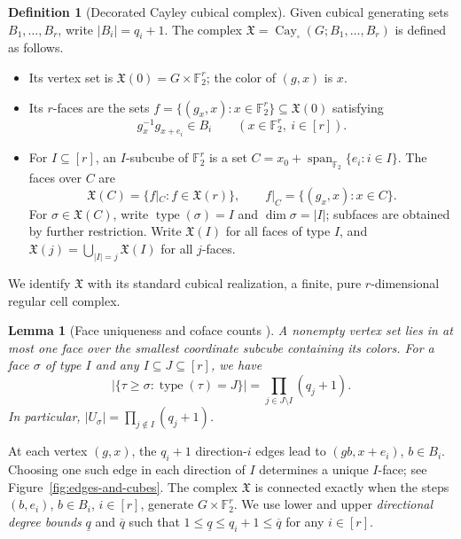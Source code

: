\documentclass[11pt,letterpaper]{article}
\renewcommand{\le}{\leqslant}
\renewcommand{\ge}{\geqslant}
\newtheorem{lemma}[theorem]{Lemma}
\theoremstyle{definition}
\newtheorem{definition}[theorem]{Definition}
\theoremstyle{remark}
\newcommand{\F}{\mathbb F}
\newcommand{\X}{\mathfrak{X}}
\begin{document}
\begin{definition}[Decorated Cayley cubical complex]
\label{def:cayley-cubical}\label{def:colored-cubical}
Given cubical generating sets $B_1,\ldots,B_r$, write $|B_i|=q_i+1$.
The complex $\X=\operatorname{Cay}_{\square}(G;B_1,\ldots,B_r)$
is defined as follows.
\begin{itemize}
\item Its vertex set is $\X(0)=G\times\F_2^r$; the color of
$(g,x)$ is $x$.
\item Its $r$-faces are the sets
$f=\{(g_x,x):x\in\F_2^r\}\subseteq\X(0)$ satisfying
\[
 g_x^{-1}g_{x+e_i}\in B_i\qquad(x\in\F_2^r,\ i\in[r]).
\]
\item For $I\subseteq[r]$, an $I$-subcube of $\F_2^r$ is a set
$C=x_0+\operatorname{span}_{\F_2}\{e_i:i\in I\}$.
The faces over $C$ are
\[
 \X(C)=\{f|_C:f\in\X(r)\},\qquad
 f|_C=\{(g_x,x):x\in C\}.
\]
For $\sigma\in\X(C)$, write $\operatorname{type}(\sigma)=I$
and $\dim\sigma=|I|$; subfaces are obtained by further restriction.
Write $\X(I)$ for all faces of type $I$, and
$\X(j)=\bigcup_{|I|=j}\X(I)$ for all $j$-faces.
\end{itemize}
We identify $\X$ with its standard cubical realization,
a finite, pure $r$-dimensional regular cell complex.
\end{definition}
\begin{lemma}[Face uniqueness and coface counts {\cite[Lemma~3.3]{HLMRZ2025}}]
\label{lem:cubical-incidence}
{A nonempty vertex set lies in at most one face over the smallest
coordinate subcube containing its colors. For a face $\sigma$ of
type $I$ and any $I\subseteq J\subseteq[r]$, we have
\[
 \bigl|\{\tau\ge\sigma:\operatorname{type}(\tau)=J\}\bigr|
 =\prod_{j\in J\setminus I}(q_j+1).
\]
In particular, $|U_\sigma|=\prod_{j\notin I}(q_j+1)$.}
\end{lemma}

At each vertex $(g,x)$, the $q_i+1$ direction-$i$ edges lead to
$(gb,x+e_i)$, $b\in B_i$. Choosing one such edge in each direction
of $I$ determines a unique $I$-face; see
Figure~\ref{fig:edges-and-cubes}.
The complex $\X$ is connected exactly when the steps $(b,e_i)$,
$b\in B_i$, $i\in[r]$, generate $G\times\F_2^r$.
We use lower and upper \emph{directional degree bounds}
$\underline q$ and $\overline q$ such that
$
 1\le\underline q\le q_i+1\le\overline q
$ for any $i\in[r]$.
\end{document}
